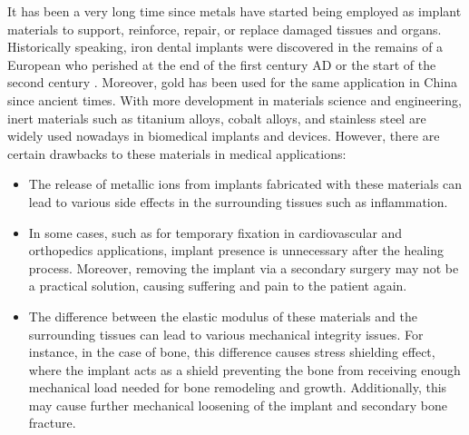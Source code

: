 It has been a very long time since metals have started being employed as implant materials to support, reinforce, repair, or replace damaged tissues and organs. Historically speaking, iron dental implants were discovered in the remains of a European who perished at the end of the first century AD or the start of the second century \cite{Crubzy1998}. Moreover, gold has been used for the same application in China since ancient times. With more development in materials science and engineering, inert materials such as titanium alloys, cobalt alloys, and stainless steel are widely used nowadays in biomedical implants and devices. However, there are certain drawbacks to these materials in medical applications:

\begin{itemize}
\item
The release of metallic ions from implants fabricated with these materials can lead to various side effects in the surrounding tissues such as inflammation.
\item
In some cases, such as for temporary fixation in cardiovascular and orthopedics applications, implant presence is unnecessary after the healing process. Moreover, removing the implant via a secondary surgery may not be a practical solution, causing suffering and pain to the patient again.
\item
The difference between the elastic modulus of these materials and the surrounding tissues can lead to various mechanical integrity issues. For instance, in the case of bone, this difference causes stress shielding effect, where the implant acts as a shield preventing the bone from receiving enough mechanical load needed for bone remodeling and growth. Additionally, this may cause further mechanical loosening of the implant and secondary bone fracture.
\end{itemize}

